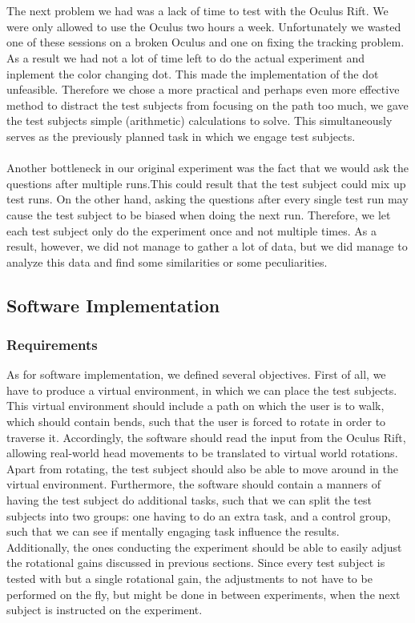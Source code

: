 \\ \\ 
The next problem we had was a lack of time to test with the Oculus Rift. We were only allowed to use the Oculus two hours a week. Unfortunately we wasted one of these sessions on a broken Oculus and one on fixing the tracking problem. As a result we had not a lot of time left to do the actual experiment and inplement the color changing dot. This made the implementation of the dot unfeasible. Therefore we chose a more practical and perhaps even more effective method to distract the test subjects from focusing on the path too much, we gave the test subjects simple (arithmetic) calculations to solve.
This simultaneously serves as the previously planned task in which we engage test subjects.\\
\\
Another bottleneck in our original experiment was the fact that we would ask the questions after multiple runs.This could result that the test subject could mix up test runs. On the other hand, asking the questions after every single test run may cause the test subject to be biased when doing the next run.
Therefore, we let each test subject only do the experiment once and not multiple times.
As a result, however, we did not manage to gather a lot of data, but we did manage to analyze this data and find some similarities or some peculiarities.

\subsection{Software Implementation}
\subsubsection{Requirements}
As for software implementation, we defined several objectives.
First of all, we have to produce a virtual environment, in which we can place the test subjects.
This virtual environment should include a path on which the user is to walk, which should contain bends, such that the user is forced to rotate in order to traverse it.
Accordingly, the software should read the input from the Oculus Rift, allowing real-world head movements to be translated to virtual world rotations.
Apart from rotating, the test subject should also be able to move around in the virtual environment.
Furthermore, the software should contain a manners of having the test subject do additional tasks, such that we can split the test subjects into two groups: one having to do an extra task, and a control group, such that we can see if mentally engaging task influence the results.\\
Additionally, the ones conducting the experiment should be able to easily adjust the rotational gains discussed in previous sections.
Since every test subject is tested with but a single rotational gain, the adjustments to not have to be performed on the fly, but might be done in between experiments, when the next subject is instructed on the experiment.

